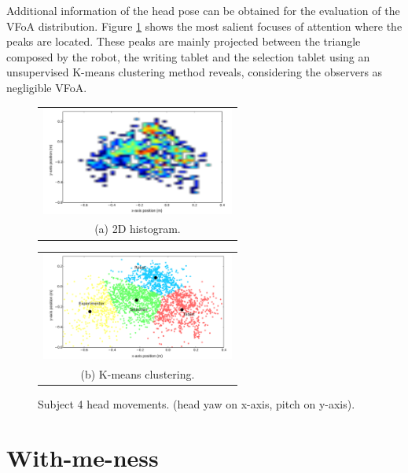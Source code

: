 \documentclass{sig-alternate}
\begin{document}
Additional information of the head pose can be obtained for the evaluation of
the VFoA distribution. Figure \ref{fig:heatmap} shows the most salient focuses
of attention where the peaks are located. These peaks are mainly projected
between the triangle composed by the robot, the writing tablet and the selection
tablet using an unsupervised K-means clustering method reveals, considering the
observers as negligible VFoA.

\begin{figure}[th!]
  \centering
  \begin{tabular}{@{}c@{}}
    \includegraphics[width=.7\linewidth,height=100pt]{heatmap} \\
    \small (a)  2D histogram.
  \end{tabular}

  \vspace{\floatsep}

  \begin{tabular}{@{}c@{}}
    \includegraphics[width=.7\linewidth,height=100pt]{kmeans} \\
    \small (b) K-means clustering.
  \end{tabular}

  \caption{ \small Subject 4 head movements. (head yaw on x-axis, pitch on y-axis).}
  \label{fig:heatmap}
\end{figure}




\section{With-me-ness}
\end{document}
